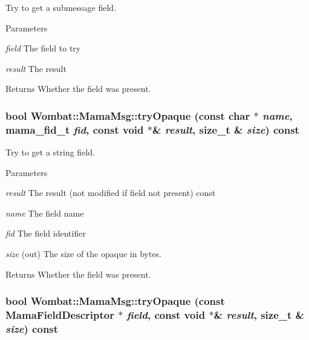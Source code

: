Try to get a submessage field. 
\begin{DoxyParams}{Parameters}
\item[{\em field}]The field to try \item[{\em result}]The result \end{DoxyParams}
\begin{DoxyReturn}{Returns}
Whether the field was present. 
\end{DoxyReturn}
\hypertarget{classWombat_1_1MamaMsg_a90ce9c7851b9086fef620168759d2368}{
\subsubsection[{tryOpaque}]{\setlength{\rightskip}{0pt plus 5cm}bool Wombat::MamaMsg::tryOpaque (const char $\ast$ {\em name}, \/  mama\_\-fid\_\-t {\em fid}, \/  const void $\ast$\& {\em result}, \/  size\_\-t \& {\em size}) const}}
\label{classWombat_1_1MamaMsg_a90ce9c7851b9086fef620168759d2368}


Try to get a string field. 
\begin{DoxyParams}{Parameters}
\item[{\em result}]The result (not modified if field not present) const \item[{\em name}]The field name \item[{\em fid}]The field identifier \item[{\em size}](out) The size of the opaque in bytes. \end{DoxyParams}
\begin{DoxyReturn}{Returns}
Whether the field was present. 
\end{DoxyReturn}
\hypertarget{classWombat_1_1MamaMsg_a968df33a21a943014ea264edbb90520a}{
\subsubsection[{tryOpaque}]{\setlength{\rightskip}{0pt plus 5cm}bool Wombat::MamaMsg::tryOpaque (const {\bf MamaFieldDescriptor} $\ast$ {\em field}, \/  const void $\ast$\& {\em result}, \/  size\_\-t \& {\em size}) const}}
\label{classWombat_1_1MamaMsg_a968df33a21a943014ea264edbb90520a}


